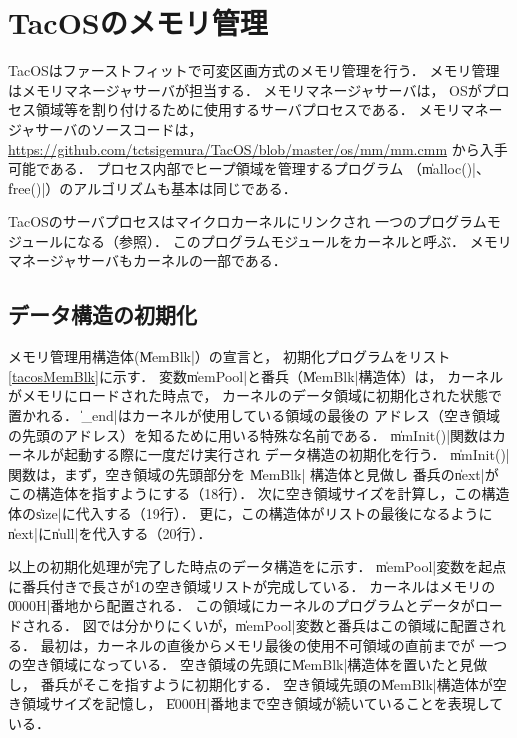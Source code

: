 \chapter{TacOSのメモリ管理}
\label{tacosMalloc}
TacOSはファーストフィットで可変区画方式のメモリ管理を行う．
メモリ管理はメモリマネージャサーバが担当する．
メモリマネージャサーバは，
OSがプロセス領域等を割り付けるために使用するサーバプロセスである．
メモリマネージャサーバのソースコードは，
\url{https://github.com/tctsigemura/TacOS/blob/master/os/mm/mm.cmm}
から入手可能である．
プロセス内部でヒープ領域を管理するプログラム
（\|malloc()|、\|free()|）のアルゴリズムも基本は同じである．

TacOSのサーバプロセスはマイクロカーネルにリンクされ
一つのプログラムモジュールになる（参照）．
このプログラムモジュールをカーネルと呼ぶ．
メモリマネージャサーバもカーネルの一部である．

\section{データ構造の初期化}
メモリ管理用構造体(\|MemBlk|）の宣言と，
初期化プログラムをリスト\ref{tacosMemBlk}に示す．
変数\|memPool|と番兵（\|MemBlk|構造体）は，
カーネルがメモリにロードされた時点で，
カーネルのデータ領域に初期化された状態で置かれる．
\|_end|はカーネルが使用している領域の最後の
アドレス（空き領域の先頭のアドレス）を知るために用いる特殊な名前である．
\|mmInit()|関数はカーネルが起動する際に一度だけ実行され
データ構造の初期化を行う．
\|mmInit()|関数は，まず，空き領域の先頭部分を \|MemBlk| 構造体と見做し
番兵の\|next|がこの構造体を指すようにする（18行）．
次に空き領域サイズを計算し，この構造体の\|size|に代入する（19行）．
更に，この構造体がリストの最後になるように
\|next|に\|null|を代入する（20行）．



以上の初期化処理が完了した時点のデータ構造をに示す．
\|memPool|変数を起点に番兵付きで長さが1の空き領域リストが完成している．
カーネルはメモリの\|0000H|番地から配置される．
この領域にカーネルのプログラムとデータがロードされる．
図では分かりにくいが，\|memPool|変数と番兵はこの領域に配置される．
最初は，カーネルの直後からメモリ最後の使用不可領域の直前までが
一つの空き領域になっている．
空き領域の先頭に\|MemBlk|構造体を置いたと見做し，
番兵がそこを指すように初期化する．
空き領域先頭の\|MemBlk|構造体が空き領域サイズを記憶し，
\|E000H|番地まで空き領域が続いていることを表現している．


